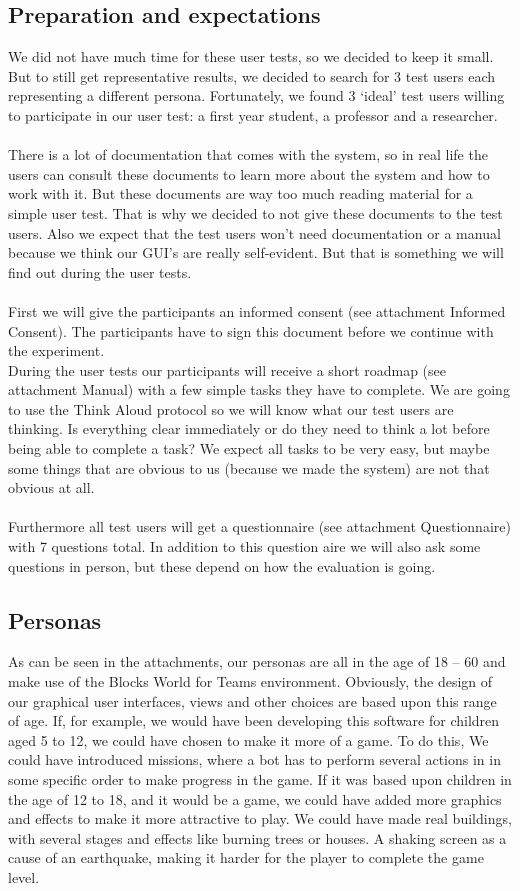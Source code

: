 \documentclass[]{article}
\begin{document}
\subsection{Preparation and expectations }
We did not have much time for these user tests, so we decided to
keep it small. But to still get representative results, we decided
to search for 3 test users each representing a different persona. Fortunately, we found 3 ‘ideal’ test users willing to participate in
our user test: a first year student, a professor and a researcher.\\
\\ 
There is a lot of documentation that comes with the system, so in
real life the users can consult these documents to learn more about
the system and how to work with it. But these documents are way too
much reading material for a simple user test. That is why we decided
to not give these documents to the test users. Also we expect that
the test users won’t need documentation or a manual because we think
our GUI’s are really self-evident. But that is something we will
find out during the user tests. \\
\\
First we will give the participants an informed consent (see
attachment Informed Consent). The participants have to sign this
document before we continue with the experiment.\\
During the user tests our participants will receive a short roadmap
(see attachment Manual) with a few simple tasks they have to
complete. We are going to use the Think Aloud protocol so we will
know what our test users are thinking. Is everything clear immediately or do they need to think a lot before being able to complete a
task? We expect all tasks to be very easy, but maybe some things
that are obvious to us (because we made the system) are not that
obvious at all. \\
\\
Furthermore all test users will get a questionnaire (see attachment
Questionnaire) with 7 questions total. In addition to this question
aire we will also ask some questions in person, but these depend on
how the evaluation is going.
\subsection{Personas}
As can be seen in the attachments, our personas are all in the age of 18 – 60 and make use of the Blocks World for Teams environment. Obviously, the design of our graphical user interfaces, views and other choices are based upon this range of age. If, for example, we would have been developing this software for children aged 5 to 12, we could have chosen to make it more of a game. To do this, We could have introduced missions, where a bot has to perform several actions in in some specific order to make progress in the game. 
If it was based upon children in the age of 12 to 18, and it would be a game, we could have added more graphics and effects to make it more attractive to play. We could have made real buildings, with several stages and effects like burning trees or houses. A shaking screen as a cause of an earthquake, making it harder for the player to complete the game level. \\
\end{document}
